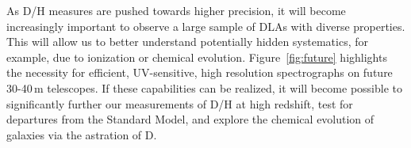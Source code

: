 \documentclass[12pt,preprint,useAMS,usenatbib]{emulateapj}
\begin{document}
\begin{appendix}
As D/H measures are pushed towards higher precision,
it will become increasingly important to observe a large
sample of DLAs with diverse properties. This will allow
us to better understand potentially hidden systematics,
for example, due to ionization or chemical evolution.
Figure~\ref{fig:future} highlights the necessity for
efficient, UV-sensitive, high resolution spectrographs on
future 30-40\,m telescopes. If these capabilities can be
realized, it will become possible to significantly further
our measurements of D/H at high redshift, test for
departures from the Standard Model, and explore the
chemical evolution of galaxies via the astration of D.

\end{appendix}

\end{document}
